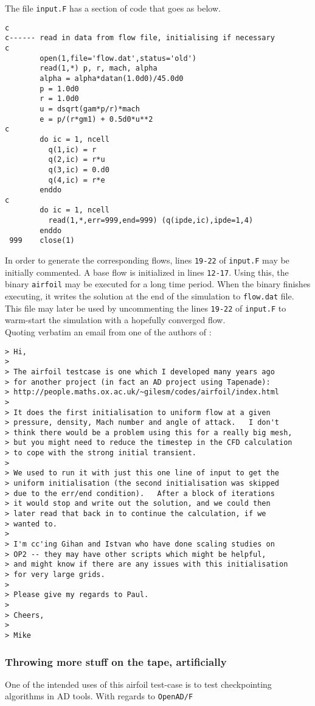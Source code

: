 \noindent The file \texttt{input.F} has a section of code that goes as below.\\

\begin{lstlisting}[language=myfortran]
c
c------ read in data from flow file, initialising if necessary
c
        open(1,file='flow.dat',status='old')
        read(1,*) p, r, mach, alpha
        alpha = alpha*datan(1.0d0)/45.0d0
        p = 1.0d0
        r = 1.0d0
        u = dsqrt(gam*p/r)*mach
        e = p/(r*gm1) + 0.5d0*u**2
c
        do ic = 1, ncell
          q(1,ic) = r
          q(2,ic) = r*u
          q(3,ic) = 0.d0
          q(4,ic) = r*e
        enddo
c
        do ic = 1, ncell
          read(1,*,err=999,end=999) (q(ipde,ic),ipde=1,4)
        enddo
 999    close(1)
\end{lstlisting}
\hfill \break
In order to generate the corresponding flows, lines \texttt{19-22} of \texttt{input.F} may be initially commented. A base flow is initialized in lines \texttt{12-17}. Using this, the binary \texttt{airfoil} may be executed for a long time period. When the binary finishes executing, it writes the solution at the end of the simulation to \texttt{flow.dat} file. This file may later be used by uncommenting the lines \texttt{19-22} of \texttt{input.F} to warm-start the simulation with a hopefully converged flow.\\

\noindent Quoting verbatim an email from one of the authors of \cite{Giles_2005}:

\begin{verbatim}
> Hi,
>
> The airfoil testcase is one which I developed many years ago 
> for another project (in fact an AD project using Tapenade):
> http://people.maths.ox.ac.uk/~gilesm/codes/airfoil/index.html
>
> It does the first initialisation to uniform flow at a given 
> pressure, density, Mach number and angle of attack.   I don't
> think there would be a problem using this for a really big mesh,
> but you might need to reduce the timestep in the CFD calculation
> to cope with the strong initial transient.
>
> We used to run it with just this one line of input to get the
> uniform initialisation (the second initialisation was skipped
> due to the err/end condition).   After a block of iterations 
> it would stop and write out the solution, and we could then 
> later read that back in to continue the calculation, if we 
> wanted to.
>
> I'm cc'ing Gihan and Istvan who have done scaling studies on 
> OP2 -- they may have other scripts which might be helpful, 
> and might know if there are any issues with this initialisation 
> for very large grids.
>
> Please give my regards to Paul.
>
> Cheers,
>
> Mike
\end{verbatim}
\subsubsection{Throwing more stuff on the tape, artificially}
One of the intended uses of this airfoil test-case is to test checkpointing algorithms in AD tools. With regards to \texttt{OpenAD/F}
